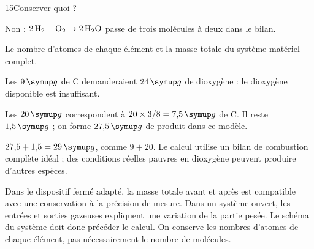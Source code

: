 \par\noindent\begin{minipage}{\linewidth}
\begin{corrige}{15}{Conserver quoi ?}
\begin{questions}
\item Non : $2\,\ce{H2}+\ce{O2}\rightarrow2\,\ce{H2O}$ passe de trois molécules à deux dans le bilan.
\item Le nombre d’atomes de chaque élément et la masse totale du système matériel complet.
\end{questions}
\end{corrige}
\end{minipage}
\par\noindent\begin{minipage}{\linewidth}
\label{cor-defi-7}\begin{questions}
\item Les $9\unite g$ de C demanderaient $24\unite g$ de dioxygène : le dioxygène disponible est insuffisant.
\item Les $20\unite g$ correspondent à $20\times3/8=7{,}5\unite g$ de C. Il reste $1{,}5\unite g$ ; on forme $27{,}5\unite g$ de produit dans ce modèle.
\item $27{,}5+1{,}5=29\unite g$, comme $9+20$. Le calcul utilise un bilan de combustion complète idéal ; des conditions réelles pauvres en dioxygène peuvent produire d’autres espèces.
\end{questions}
\end{minipage}
\par\noindent\begin{minipage}{\linewidth}
\label{cor-activite-7}
Dans le dispositif fermé adapté, la masse totale avant et après est compatible avec une conservation à la précision de mesure. Dans un système ouvert, les entrées et sorties gazeuses expliquent une variation de la partie pesée. Le schéma du système doit donc précéder le calcul. On conserve les nombres d’atomes de chaque élément, pas nécessairement le nombre de molécules.\par\end{minipage}
